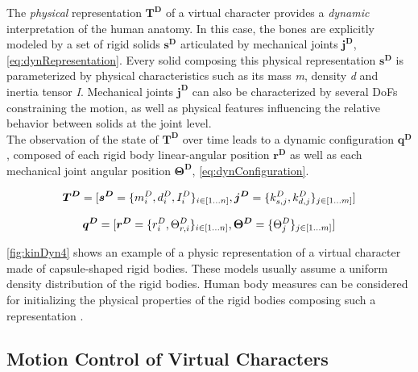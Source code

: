 The \emph{physical} representation $\boldsymbol{T^D}$ of a virtual character provides a \emph{dynamic} interpretation of the human anatomy. In this case, the bones are explicitly modeled by a set of rigid solids $\boldsymbol{s^D}$ articulated by mechanical joints $\boldsymbol{j^D}$, \myequname \eqref{eq:dynRepresentation}. Every solid composing this physical representation $\boldsymbol{s^D}$ is parameterized by physical characteristics such as its mass \emph{m}, density \emph{d} and inertia tensor \emph{I}. Mechanical joints $\boldsymbol{j^D}$ can also be characterized by several DoFs constraining the motion, as well as physical features influencing the relative behavior between solids at the joint level.\\

The observation of the state of $\boldsymbol{T^D}$ over time leads to a dynamic configuration $\boldsymbol{q^D}$, composed of each rigid body linear-angular position $\boldsymbol{r^D}$ as well as each mechanical joint angular position $\boldsymbol{\Theta^D}$, \myequname \eqref{eq:dynConfiguration}. 

\begin{equation}
	\boldsymbol{T^D} = [\boldsymbol{s^D} = \lbrace m^D_i, d^D_i, I^D_i\rbrace_{i \in [1 \dots n]}, \boldsymbol{j^D} = \lbrace k^D_{s, j}, k^D_{d, j}\rbrace_{j \in [1 \dots m]}]
\label{eq:dynRepresentation}
\eqcaption{Virtual character dynamic representation}
\end{equation}

\vspace{-0.4cm}

\begin{equation}
	\boldsymbol{q^D} = [\boldsymbol{r^D} = \lbrace r^D_i, \Theta^D_{r, i}\rbrace_{i \in [1 \dots n]}, \boldsymbol{\Theta^D} = \lbrace \Theta^D_j\rbrace_{j \in [1 \dots m]}]
\label{eq:dynConfiguration}
\eqcaption{Virtual character dynamic configuration}
\end{equation}

\myfigname \ref{fig:kinDyn4} shows an example of a physic representation of a virtual character made of capsule-shaped rigid bodies. These models usually assume a uniform density distribution of the rigid bodies. Human body measures can be considered for initializing the physical properties of the rigid bodies composing such a representation .


		\subsection{Motion Control of Virtual Characters}
		\label{subsec:CA_MC}

